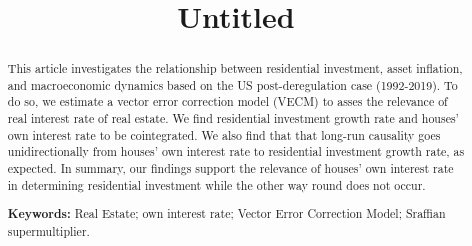 %


\usepackage{graphicx}
\usepackage{tabularx}
\usepackage{lscape}

\usepackage{multirow}
\usepackage{tablefootnote}
\usepackage{threeparttable}
\usepackage{booktabs}
\usepackage{float}
\usepackage{comment}

\usepackage[T1]{fontenc}
\usepackage[utf8]{inputenc}%
\usepackage[american]{babel}
\usepackage{setspace}
\usepackage{amssymb}
\usepackage{amsmath}%
\usepackage{mathptmx}%
\usepackage{url}
\usepackage{caption}
\usepackage{indentfirst}
\usepackage{csquotes}
\usepackage{lipsum}
\usepackage[titletoc,title]{appendix}

\usepackage{tikz}
\usetikzlibrary{through,calc}





\title{Untitled}


	
\maketitle

\begin{abstract}
	This article investigates the relationship between residential investment, asset inflation, and macroeconomic dynamics based on the US post-deregulation case (1992-2019).
	To do so, we estimate a vector error correction model (VECM) to asses the relevance of real interest rate of real estate. 
	We find residential investment growth rate and houses' own interest rate  to be cointegrated. We also find that that long-run causality goes unidirectionally from houses' own interest rate to residential investment growth rate, as expected.  In summary, our findings support the relevance of houses' own interest rate in determining residential investment while the other way round does not occur. 
	
	\noindent\textbf{Keywords:} Real Estate; own interest rate; Vector Error Correction Model; Sraffian supermultiplier.
\end{abstract}


